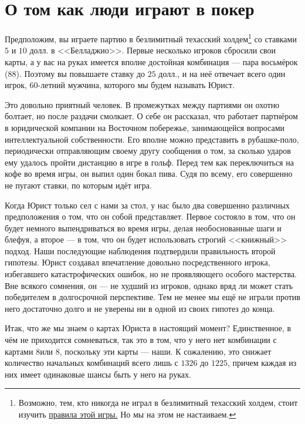 \documentclass[12pt, a4paper, oneside]{extreport}
\theoremstyle{plain}              %
\theoremstyle{definition}         %
\begin{document}
\section{О том как люди играют в покер}

Предположим, вы играете партию в безлимитный техасский холдем\footnote{Возможно, тем, кто никогда не играл в безлимитный техасский холдем, стоит изучить \href{https://ru.wikipedia.org/wiki/Техасский_холдем}{правила этой игры.} Но мы на этом не настаиваем. } со ставками $5$ и $10$ долл. в <<Белладжио>>. Первые несколько игроков сбросили свои карты, а у вас на руках имеется вполне достойная комбинация --- пара восьмёрок ($8$\clubsuit $8$\spadesuit). Поэтому вы повышаете ставку до $25$ долл., и на неё отвечает всего один игрок, $60$-летний мужчина, которого мы будем называть Юрист.

Это довольно приятный человек. В промежутках между партиями он охотно болтает, но после раздачи смолкает. О себе он рассказал, что работает партнёром в юридической компании на Восточном побережье, занимающейся вопросами интеллектуальной собственности. Его вполне можно представить в рубашке-поло, периодически отправляющим своему другу сообщения о том, за сколько ударов ему удалось пройти дистанцию в игре в гольф. Перед тем как переключиться на кофе во время игры, он выпил один бокал пива. Судя по всему, его совершенно не пугают ставки, по которым идёт игра.

Когда Юрист только сел с нами за стол, у нас было два совершенно различных предположения о том, что он собой представляет. Первое состояло в том, что он будет немного выпендриваться во время игры, делая необоснованные шаги и блефуя, а второе --- в том, что он будет использовать строгий <<книжный>> подход. Наши последующие наблюдения подтвердили правильность второй гипотезы. Юрист создавал впечатление довольно посредственного игрока, избегавшего катастрофических ошибок, но не проявляющего особого мастерства. Вне всякого сомнения, он --- не худший из игроков, однако вряд ли может стать победителем в долгосрочной перспективе. Тем не менее мы ещё не играли против него достаточно долго и не уверены ни в одной из своих гипотез до конца.

Итак, что же мы знаем о картах Юриста в настоящий момент? Единственное, в чём не приходится сомневаться, так это в том, что у него нет комбинации с картами $8$\clubsuit  или $8$\spadesuit, поскольку эти карты --- наши. К сожалению, это снижает количество начальных комбинаций всего лишь с $1326$ до $1225$, причем каждая из них имеет одинаковые шансы быть у него на руках.
\end{document}
